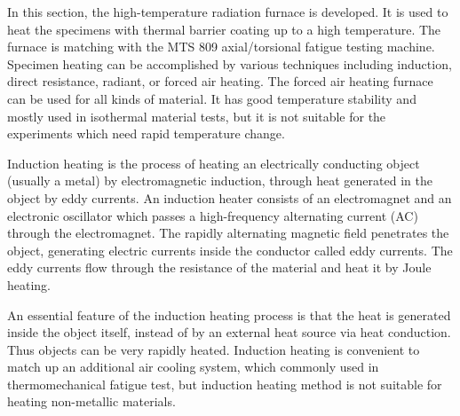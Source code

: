 
\noindent
In this section, the high-temperature radiation furnace is developed.
It is used to heat the specimens with thermal barrier coating up to a high temperature.
The furnace is matching with the MTS 809 axial/torsional fatigue testing machine.
Specimen heating can be accomplished by various techniques including induction, direct resistance, radiant, or forced air heating.
The forced air heating furnace can be used for all kinds of material. It has good temperature stability and mostly used in isothermal material tests, but it is not suitable for the experiments which need rapid temperature change.

Induction heating is the process of heating an electrically conducting object (usually a metal) by electromagnetic induction, through heat generated in the object by eddy currents. An induction heater consists of an electromagnet and an electronic oscillator which passes a high-frequency alternating current (AC) through the electromagnet. The rapidly alternating magnetic field penetrates the object, generating electric currents inside the conductor called eddy currents. The eddy currents flow through the resistance of the material and heat it by Joule heating.

An essential feature of the induction heating process is that the heat is generated inside the object itself, instead of by an external heat source via heat conduction. Thus objects can be very rapidly heated.
Induction heating is convenient to match up an additional air cooling system, which commonly used in thermomechanical fatigue test, but induction heating method is not suitable for heating non-metallic materials.


